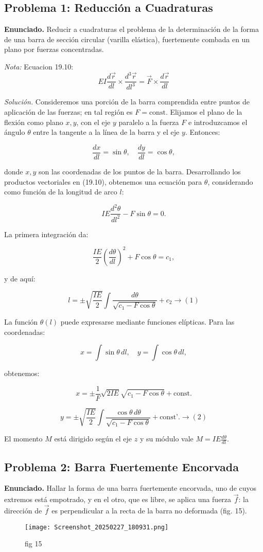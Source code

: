 \documentclass{article}
\begin{document}
\subsection*{Problema 1: Reducción a Cuadraturas}
\textbf{Enunciado.} Reducir a cuadraturas el problema de la determinación de la forma de una barra de sección circular (varilla elástica), fuertemente combada en un plano por fuerzas concentradas.

\textit{Nota:} Ecuacion 19.10: $$ EI\frac{d\vec{r}}{dl}\times \frac{d^{3}\vec{r}}{dl^{3}} = \vec{F}\times\frac{d\vec{r}}{dl}$$

\textit{Solución.} Consideremos una porción de la barra comprendida entre puntos de aplicación de las fuerzas; en tal región es $F = \text{const}$. Elijamos el plano de la flexión como plano $x, y$, con el eje $y$ paralelo a la fuerza $F$ e introduzcamos el ángulo $\theta$ entre la tangente a la línea de la barra y el eje $y$. Entonces:

$$
\frac{dx}{dl} = \sin \theta, \quad \frac{dy}{dl} = \cos \theta,
$$

donde $x, y$ son las coordenadas de los puntos de la barra. Desarrollando los productos vectoriales en (19.10), obtenemos una ecuación para $\theta$, considerando como función de la longitud de arco $l$:

$$
IE \frac{d^2 \theta}{dl^2} - F \sin \theta = 0.
$$

La primera integración da:

$$
\frac{IE}{2} \left( \frac{d\theta}{dl} \right)^2 + F \cos \theta = c_1,
$$

y de aquí:

$$
l = \pm \sqrt{\frac{IE}{2}} \int \frac{d\theta}{\sqrt{c_1 - F \cos \theta}} + c_2 \rightarrow (1)
$$

La función $\theta(l)$ puede expresarse mediante funciones elípticas. Para las coordenadas:

$$
x = \int \sin \theta \, dl, \quad y = \int \cos \theta \, dl,
$$

obtenemos:

$$
x = \pm \frac{1}{F} \sqrt{2IE} \sqrt{c_1 - F \cos \theta} + \text{const.}
$$

$$
y = \pm \sqrt{\frac{IE}{2}} \int \frac{\cos \theta \, d\theta}{\sqrt{c_1 - F \cos \theta}} + \text{const'.} \rightarrow (2)
$$

El momento $M$ está dirigido según el eje $z$ y su módulo vale $M = IE \frac{d\theta}{dl}$.

\subsection*{Problema 2: Barra Fuertemente Encorvada}
\textbf{Enunciado.} Hallar la forma de una barra fuertemente encorvada, uno de cuyos extremos está empotrado, y en el otro, que es libre, se aplica una fuerza $\vec{f}$: la dirección de $\vec{f}$ es perpendicular a la recta de la barra no deformada (fig. 15).
\begin{figure}[ht]
    \centering
    \texttt{[image: Screenshot\_20250227\_180931.png]}
    \caption{fig 15}
\end{figure}
\end{document}
